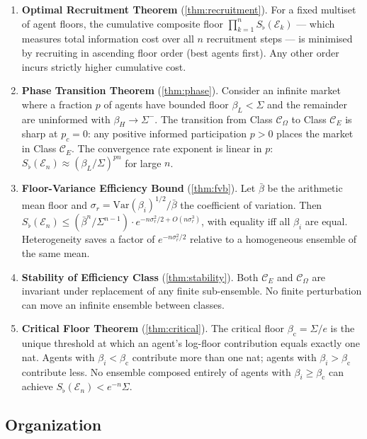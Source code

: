 \documentclass[twocolumn,11pt,a4paper]{article}
\theoremstyle{remark}
\newcommand{\Sflat}{S_{\flat}}
\newcommand{\Ens}{\mathcal{E}}
\newcommand{\ClassE}{\mathcal{C}_E}       %
\newcommand{\ClassO}{\mathcal{C}_\Omega}  %
\newcommand{\Var}{\mathrm{Var}}           %
\newcommand{\CV}{\sigma_r}               %
\newcommand{\Crit}{\beta_{\mathrm{c}}}   %
\begin{document}
\begin{enumerate}[leftmargin=*, label=\textbf{(\roman*)}]
\item \textbf{Optimal Recruitment Theorem}
  (\cref{thm:recruitment}).
  For a fixed multiset of agent floors, the cumulative composite floor
  $\prod_{k=1}^n \Sflat(\Ens_k)$ — which measures total information cost
  over all $n$ recruitment steps — is minimised by recruiting in ascending
  floor order (best agents first).  Any other order incurs strictly higher
  cumulative cost.

\item \textbf{Phase Transition Theorem}
  (\cref{thm:phase}).
  Consider an infinite market where a fraction $p$ of agents have bounded
  floor $\beta_L < \Sigma$ and the remainder are uninformed with
  $\beta_H \to \Sigma^-$.  The transition from Class $\ClassO$ to Class
  $\ClassE$ is sharp at $p_c = 0$: any positive informed participation
  $p>0$ places the market in Class $\ClassE$.  The convergence rate exponent
  is linear in $p$: $\Sflat(\Ens_n) \approx (\beta_L/\Sigma)^{pn}$ for
  large $n$.

\item \textbf{Floor-Variance Efficiency Bound}
  (\cref{thm:fvb}).
  Let $\bar\beta$ be the arithmetic mean floor and $\CV = \Var(\beta_i)^{1/2}/
  \bar\beta$ the coefficient of variation.  Then
  $\Sflat(\Ens_n) \le (\bar\beta^n/\Sigma^{n-1}) \cdot
  e^{-n\CV^2/2 + O(n\CV^3)}$, with equality iff all $\beta_i$ are equal.
  Heterogeneity saves a factor of $e^{-n\CV^2/2}$ relative to a
  homogeneous ensemble of the same mean.

\item \textbf{Stability of Efficiency Class}
  (\cref{thm:stability}).
  Both $\ClassE$ and $\ClassO$ are invariant under replacement of any finite
  sub-ensemble.  No finite perturbation can move an infinite ensemble between
  classes.

\item \textbf{Critical Floor Theorem}
  (\cref{thm:critical}).
  The critical floor $\Crit = \Sigma/e$ is the unique threshold at which an
  agent's log-floor contribution equals exactly one nat.  Agents with
  $\beta_i < \Crit$ contribute more than one nat; agents with
  $\beta_i > \Crit$ contribute less.  No ensemble composed entirely of agents
  with $\beta_i \ge \Crit$ can achieve $\Sflat(\Ens_n) < e^{-n}\Sigma$.
\end{enumerate}

\subsection{Organization}
\label{sec:intro:org}
\end{document}
